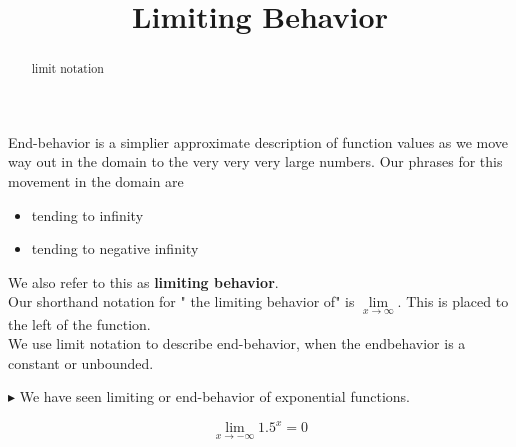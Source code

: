 \documentclass{ximera}
\title{Limiting Behavior}
\begin{document}
\begin{abstract}
limit notation
\end{abstract}
\maketitle




End-behavior is a simplier approximate description of function values as we move way out in the domain to the very very very large numbers.  Our phrases for this movement in the domain are 

\begin{itemize}
\item tending to infinity
\item tending to negative infinity
\end{itemize}


We also refer to this as \textbf{limiting behavior}. \\


Our shorthand notation for " the limiting behavior of" is $\lim\limits_{x \to \infty}$.  This is placed to the left of the function. \\






We use limit notation to describe end-behavior, when the endbehavior is a constant or unbounded.






$\blacktriangleright$  We have seen limiting or end-behavior of exponential functions.


\[   \lim_{x \to -\infty} 1.5^x   = 0      \]


\begin{image}
\end{image}
\end{document}

